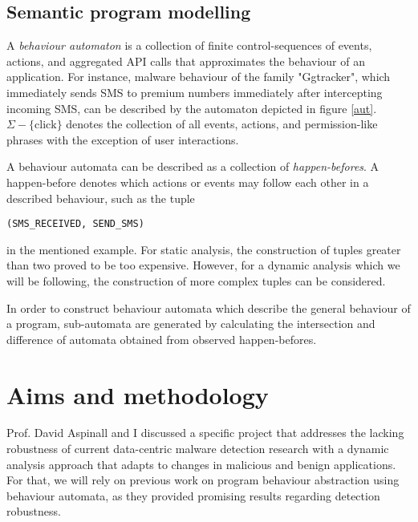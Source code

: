 \documentclass[a4paper,12pt,twoside]{report}
\begin{document}
\subsection{Semantic program modelling}




A \textit{behaviour automaton} is a collection  of  finite  control-sequences  of  events,  actions,  and aggregated API calls that approximates the behaviour of an application. For instance, malware behaviour of the family "Ggtracker", which immediately sends SMS to premium numbers immediately after intercepting incoming SMS, can be described by the automaton depicted in figure \ref{aut}.  $\Sigma - \{\text{click}\}$ denotes the collection of all events,  actions,  and permission-like phrases with the exception of user interactions.

A behaviour automata can be described as a collection of \textit{happen-befores}. A happen-before denotes which actions or events may follow each other in a described behaviour, such as the tuple \begin{verbatim}
(SMS_RECEIVED, SEND_SMS)
\end{verbatim}
in the mentioned example. For static analysis, the construction of tuples greater than two proved to be too expensive. However, for a dynamic analysis which we will be following, the construction of more complex tuples can be considered. 

In order to construct behaviour automata which describe the general behaviour of a program, sub-automata are generated by calculating the intersection and difference of automata obtained from observed happen-befores. 



\section{Aims and methodology}

Prof. David Aspinall and I discussed a specific project that addresses the lacking robustness of current data-centric malware detection research with a dynamic analysis approach that adapts to changes in malicious and benign applications. For that, we will rely on previous work on program behaviour abstraction using behaviour automata, as they provided promising results regarding detection robustness. 
\end{document}
